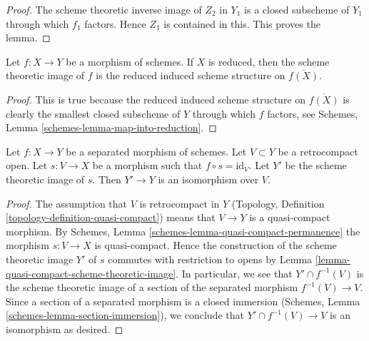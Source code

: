 \begin{proof}
The scheme theoretic inverse image of $Z_2$ in $Y_1$
is a closed subscheme of $Y_1$ through
which $f_1$ factors. Hence $Z_1$ is contained in this.
This proves the lemma.
\end{proof}

\begin{lemma}
\label{lemma-scheme-theoretic-image-reduced}
Let $f : X \to Y$ be a morphism of schemes.
If $X$ is reduced, then the scheme theoretic image of $f$ is
the reduced induced scheme structure on $\overline{f(X)}$.
\end{lemma}

\begin{proof}
This is true because the reduced induced scheme structure on $\overline{f(X)}$
is clearly the smallest closed subscheme of $Y$ through which $f$ factors,
see
Schemes, Lemma \ref{schemes-lemma-map-into-reduction}.
\end{proof}

\begin{lemma}
\label{lemma-scheme-theoretic-image-of-partial-section}
Let $f : X \to Y$ be a separated morphism of schemes.
Let $V \subset Y$ be a retrocompact open. Let $s : V \to X$
be a morphism such that $f \circ s = \text{id}_V$.
Let $Y'$ be the scheme theoretic image of $s$.
Then $Y' \to Y$ is an isomorphism over $V$.
\end{lemma}

\begin{proof}
The assumption that $V$ is retrocompact in $Y$
(Topology, Definition \ref{topology-definition-quasi-compact})
means that $V \to Y$ is a quasi-compact morphism.
By Schemes, Lemma \ref{schemes-lemma-quasi-compact-permanence}
the morphism $s : V \to X$ is quasi-compact.
Hence the construction of the scheme theoretic image $Y'$
of $s$ commutes with restriction to opens by
Lemma \ref{lemma-quasi-compact-scheme-theoretic-image}.
In particular, we see that $Y' \cap f^{-1}(V)$ is the
scheme theoretic image of a section of the separated
morphism $f^{-1}(V) \to V$. Since a section of a separated
morphism is a closed immersion
(Schemes, Lemma \ref{schemes-lemma-section-immersion}),
we conclude that
$Y' \cap f^{-1}(V) \to V$ is an isomorphism as desired.
\end{proof}







